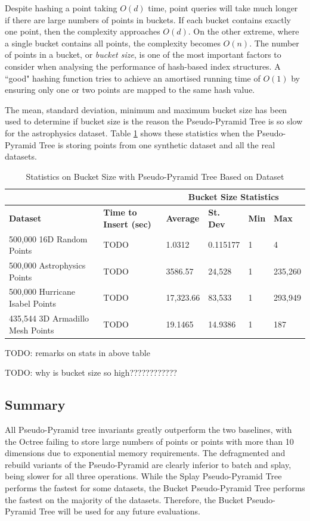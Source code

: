 Despite hashing a point taking $O(d)$ time, point queries will take much longer if there are large numbers of points in buckets. If each bucket contains exactly one point, then the complexity approaches $O(d)$. On the other extreme, where a single bucket contains all points, the complexity becomes $O(n)$. The number of points in a bucket, or \textit{bucket size}, is one of the most important factors to consider when analysing the performance of hash-based index structures. A ``good" hashing function tries to achieve an amortised running time of $O(1)$ by ensuring only one or two points are mapped to the same hash value.

The mean, standard deviation, minimum and maximum bucket size has been used to determine if bucket size is the reason the Pseudo-Pyramid Tree is so slow for the astrophysics dataset. Table \ref{tab:perf1-bucket-stats} shows these statistics when the Pseudo-Pyramid Tree is storing points from one synthetic dataset and all the real datasets.

\begin{table}
	\centering
	\begin{tabular}{|l|l|l|l|l|l|}
		\hline
		& & \multicolumn{4}{c|}{\textbf{Bucket Size Statistics}} \\
		\hline
		\textbf{Dataset} & \textbf{Time to Insert (sec)} & \textbf{Average} & \textbf{St. Dev} & \textbf{Min} & \textbf{Max} \\
		\hline
		500,000 16D Random Points & TODO & 1.0312 & 0.115177 & 1 & 4 \\
		500,000 Astrophysics Points & TODO & 3586.57 & 24,528 & 1 & 235,260 \\
		500,000 Hurricane Isabel Points & TODO & 17,323.66 & 83,533 & 1 & 293,949 \\
		435,544 3D Armadillo Mesh Points & TODO & 19.1465 & 14.9386 & 1 & 187 \\
		\hline
	\end{tabular}
	\caption{Statistics on Bucket Size with Pseudo-Pyramid Tree Based on Dataset}
	\label{tab:perf1-bucket-stats}
\end{table}

TODO: remarks on stats in above table

TODO: why is bucket size so high????????????

\subsection{Summary}

All Pseudo-Pyramid tree invariants greatly outperform the two baselines, with the Octree failing to store large numbers of points or points with more than 10 dimensions due to exponential memory requirements. The defragmented and rebuild variants of the Pseudo-Pyramid are clearly inferior to batch and splay, being slower for all three operations. While the Splay Pseudo-Pyramid Tree performs the fastest for some datasets, the Bucket Pseudo-Pyramid Tree performs the fastest on the majority of the datasets. Therefore, the Bucket Pseudo-Pyramid Tree will be used for any future evaluations.

